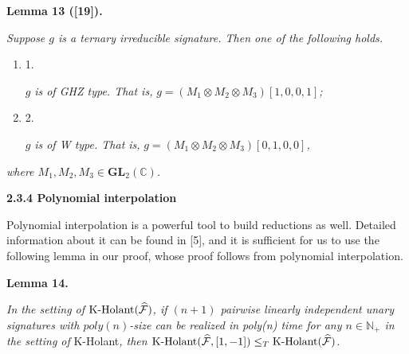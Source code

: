 \documentclass[10pt,a4paper]{article}
\begin{document}


\par\medskip\noindent\textbf{
\textbf{Lemma 13}\textbf{ }([19])\textbf{.}
}\par



\emph{Suppose $g$ is a ternary irreducible signature. Then one of the following holds.}\par


\begin{enumerate}


\item[] 
1. 


$g$\emph{ is of GHZ type. That is, }$g=(M_{1}\otimes M_{2}\otimes M_{3})[1,0,0,1]$\emph{;}\par





\item[] 
2. 


$g$\emph{ is of W type. That is, }$g=(M_{1}\otimes M_{2}\otimes M_{3})[0,1,0,0]$\emph{,}\par





\end{enumerate}


\emph{where $M_{1},M_{2},M_{3}\in\mathbf{GL}_{2}(\mathbb{C})$.}\par







\par\medskip\noindent\textbf{
2.3.4 Polynomial interpolation}\par




Polynomial interpolation is a powerful tool to build reductions as well. Detailed information about it can be found in [5], and it is sufficient for us to use the following lemma in our proof, whose proof follows from polynomial interpolation.\par





\par\medskip\noindent\textbf{
\textbf{Lemma 14}\textbf{.}
}\par



\emph{In the setting of $\textup{{K-Holant}}(\widehat{\mathcal{F}})$, if $(n+1)$ pairwise linearly independent unary signatures with $poly(n)$-size can be realized in poly(n) time for any $n\in\mathbb{N}_{+}$ in the setting of }K-Holant\emph{, then $\textup{{K-Holant}}(\widehat{\mathcal{F}},[1,-1])\leq_{T}\textup{{K-Holant}}(\widehat{\mathcal{F}})$.}\par
\end{document}
